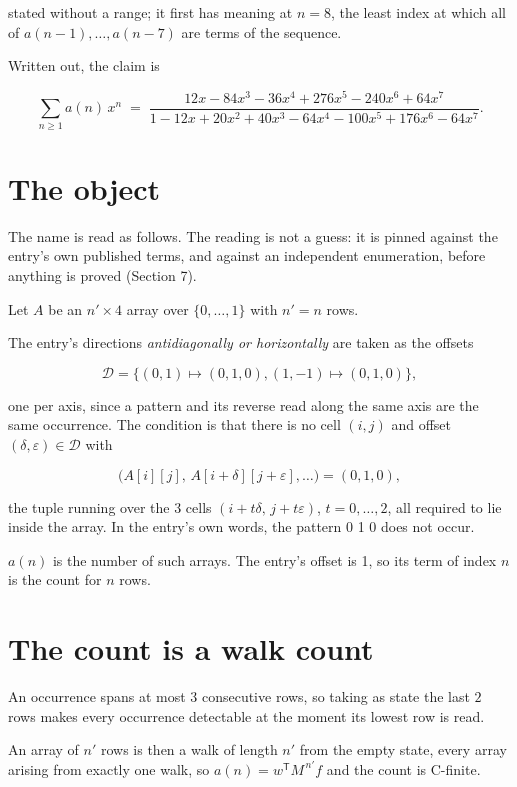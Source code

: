 \documentclass[11pt]{article}
\theoremstyle{definition}
\begin{document}
stated without a range; it first has meaning at $n = 8$, the least index at which all of $a(n-1),\dots,a(n-7)$ are terms of the sequence.

Written out, the claim is

\[\sum_{n \ge 1} a(n)\,x^n \;=\; \frac{12x - 84x^{3} - 36x^{4} + 276x^{5} - 240x^{6} + 64x^{7}}{1 - 12x + 20x^{2} + 40x^{3} - 64x^{4} - 100x^{5} + 176x^{6} - 64x^{7}}.\]

\section{The object}

The name is read as follows. The reading is not a guess: it is pinned against the entry's own published terms, and against an independent enumeration, before anything is proved (Section 7).

Let $A$ be an $n' \times 4$ array over $\{0,\dots,1\}$ with $n' = n$ rows.

The entry's directions {\itshape antidiagonally or horizontally} are taken as the offsets

\[\mathcal{D} = \{(0,1)\mapsto(0,1,0), (1,-1)\mapsto(0,1,0)\},\]

one per axis, since a pattern and its reverse read along the same axis are the same occurrence. The condition is that there is no cell $(i,j)$ and offset $(\delta,\varepsilon)\in\mathcal{D}$ with

\[\bigl(A[i][j],\,A[i{+}\delta][j{+}\varepsilon],\dots\bigr) = (0, 1, 0),\]

the tuple running over the $3$ cells $(i+t\delta,\,j+t\varepsilon)$, $t = 0,\dots,2$, all required to lie inside the array. In the entry's own words, the pattern 0 1 0 does not occur.

$a(n)$ is the number of such arrays. The entry's offset is 1, so its term of index $n$ is the count for $n$ rows.

\section{The count is a walk count}

An occurrence spans at most $3$ consecutive rows, so taking as state the last $2$ rows makes every occurrence detectable at the moment its lowest row is read.

An array of $n'$ rows is then a walk of length $n'$ from the empty state, every array arising from exactly one walk, so $a(n) = w^{\mathsf T}M^{\,n'}f$ and the count is C-finite.
\end{document}
